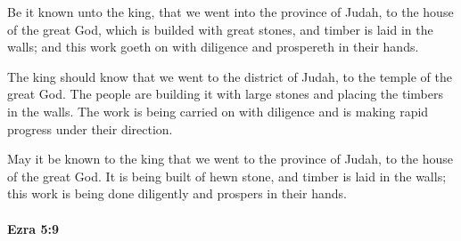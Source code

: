 			\begin{versebox}
					\item[BHS] 
					\item[LXX] 
					\item[ASV] Be it known unto the king, that we went into the province of Judah, to the house of the great God, which is builded with great stones, and timber is laid in the walls; and this work goeth on with diligence and prospereth in their hands.
					\item[NIV] The king should know that we went to the district of Judah, to the temple of the great God. The people are building it with large stones and placing the timbers in the walls. The work is being carried on with diligence and is making rapid progress under their direction.
					\item[NRSV] May it be known to the king that we went to the province of Judah, to the house of the great God. It is being built of hewn stone, and timber is laid in the walls; this work is being done diligently and prospers in their hands.
			\end{versebox}

		\paragraph{Ezra 5:9} %
			\label{EZRA-5-9}

